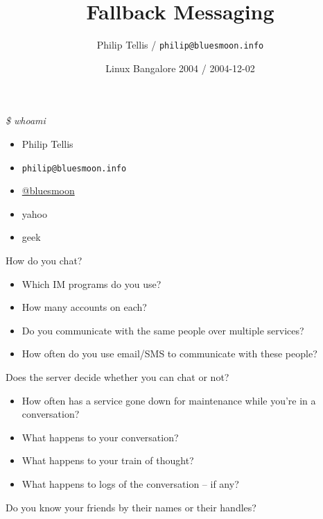 \documentclass{beamer}
\author{Philip Tellis / \texttt{philip@bluesmoon.info}}
\institute{Yahoo!}
\title{Fallback Messaging}
\date{Linux Bangalore 2004 / 2004-12-02}
\begin{document}
\begin{frame}
  \titlepage
\end{frame}


\begin{frame}{\textit{\$ whoami}}
  \begin{itemize}
  \item Philip Tellis
  \item \small{\texttt{philip@bluesmoon.info}}
  \item \href{http://twitter.com/bluesmoon}{@bluesmoon}
  \item yahoo
  \item geek
  \end{itemize}
\end{frame}


\begin{frame}{How do you chat?}
   \begin{itemize}
   \item Which IM programs do you use?
   \item How many accounts on each?
   \item Do you communicate with the same people over multiple services?
   \item How often do you use email/SMS to communicate with these people?
   \end{itemize}
\end{frame}


\begin{frame}{Does the server decide whether you can chat or not?}
   \begin{itemize}
   \item How often has a service gone down for maintenance while you're in a conversation?
   \item What happens to your conversation?
   \item What happens to your train of thought?
   \item What happens to logs of the conversation -- if any?
   \end{itemize}
\end{frame}


\begin{frame}
  \begin{block}{}
  \begin{center}
  Do you know your friends by their names or their handles?
  \end{center}
  \end{block}
\end{frame}
\end{document}
